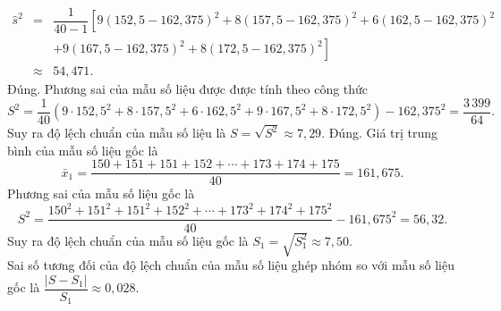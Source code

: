 \begin{ex}
{\begin{itemchoice}
			\begin{eqnarray*}
				\widehat{s}^2&=&\dfrac{1}{40-1}\left[9(152{,}5-162{,}375)^2+8(157{,}5-162{,}375)^2+6(162{,}5-162{,}375)^2\right.\\&&\left.+9(167{,}5-162{,}375)^2+8(172{,}5-162{,}375)^2\right]\\
				&\approx&54{,}471.
			\end{eqnarray*}
			\itemch Đúng. Phương sai của mẫu số liệu được được tính theo công thức
			$$S^2=\dfrac{1}{40}\left(9\cdot152{,}5^2+8\cdot157{,}5^2+6\cdot162{,}5^2+9\cdot167{,}5^2+8\cdot172{,}5^2\right)-162{,}375^2=\dfrac{3\,399}{64}.$$
			Suy ra độ lệch chuẩn của mẫu số liệu là $S=\sqrt{S^2}\approx 7{,}29$.
			\itemch Đúng. Giá trị trung bình của mẫu số liệu gốc là$$\bar{x}_1=\dfrac{150+151+151+152+\cdots+173+174+175}{40}=161{,}675.$$
			Phương sai của mẫu số liệu gốc là$$S^2=\dfrac{150^2+151^2+151^2+152^2+\cdots+173^2+174^2+175^2}{40}-161{,}675^2=56{,}32.$$
			Suy ra độ lệch chuẩn của mẫu số liệu gốc là $S_1=\sqrt{S_1^2}\approx 7{,}50$.\\
			Sai số tương đối của độ lệch chuẩn của mẫu số liệu ghép nhóm so với mẫu số liệu gốc là $\dfrac{|S-S_1|}{S_1}\approx0{,}028$.
		\end{itemchoice}
	}
\end{ex}

